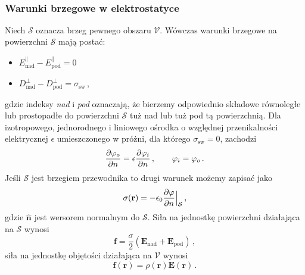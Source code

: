 \documentclass[../main.tex]{subfiles}
\begin{document}
\noindent{}\\
\subsubsection{Warunki brzegowe w elektrostatyce}
Niech \(\mathcal{S}\) oznacza brzeg pewnego obszaru \(\mathcal{V}\). Wówczas warunki brzegowe na
powierzchni \(\mathcal{S}\) mają postać:
\begin{itemize}
    \item \(E_\text{nad}^\parallel-E_\text{pod}^\parallel=0\)
    \item \(D_\text{nad}^\perp-D_\text{pod}^\perp=\sigma_\text{sw}\)\,,
\end{itemize}
gdzie indeksy \textit{nad} i \textit{pod} oznaczają, że bierzemy odpowiednio składowe równoległe lub
prostopadłe do powierzchni \(\mathcal{S}\) tuż nad lub tuż pod tą powierzchnią. Dla izotropowego,
jednorodnego i liniowego ośrodka o względnej przenikalności elektrycznej \(\epsilon\) umieszczonego
w próżni, dla którego \(\sigma_\text{sw}=0\), zachodzi
\begin{equation*}
    \pdv{\varphi_o}{n}=\epsilon\pdv{\varphi_i}{n}\,,\quad\quad \varphi_i=\varphi_o\,.
\end{equation*}
Jeśli \(\mathcal{S}\) jest brzegiem przewodnika to drugi warunek możemy zapisać jako
\begin{equation*}
    \sigma(\mathbf{r})=-\epsilon_0\pdv{\varphi}{n}\Big|_\mathcal{S}\,,
\end{equation*}
gdzie \(\mathbf{\hat{n}}\) jest wersorem normalnym do \(\mathcal{S}\). Siła na jednostkę powierzchni
działająca na \(\mathcal{S}\) wynosi
\begin{equation*}
    \mathbf{f}=\frac{\sigma}{2}(\mathbf{E}_\text{nad}+\mathbf{E}_\text{pod})\,,
\end{equation*}
siła na jednostkę objętości działająca na \(\mathcal{V}\) wynosi
\begin{equation*}
    \mathbf{f}(\mathbf{r})=\rho(\mathbf{r})\mathbf{E}(\mathbf{r})\,.
\end{equation*}
\end{document}
